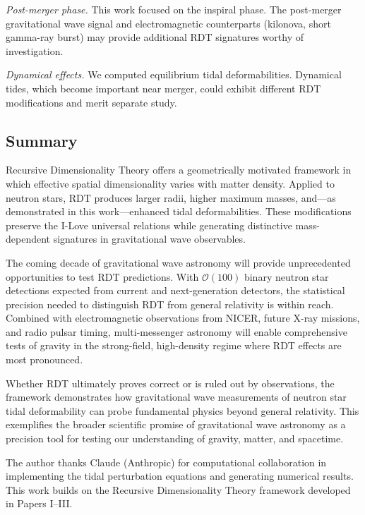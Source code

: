 \documentclass[twocolumn,showpacs,preprintnumbers,amsmath,amssymb,prd]{revtex4-2}
\begin{document}
\textit{Post-merger phase.} This work focused on the inspiral phase. The post-merger gravitational wave signal and electromagnetic counterparts (kilonova, short gamma-ray burst) may provide additional RDT signatures worthy of investigation.

\textit{Dynamical effects.} We computed equilibrium tidal deformabilities. Dynamical tides, which become important near merger, could exhibit different RDT modifications and merit separate study.

\subsection{Summary}
\label{sec:conclusions_summary}

Recursive Dimensionality Theory offers a geometrically motivated framework in which effective spatial dimensionality varies with matter density. Applied to neutron stars, RDT produces larger radii, higher maximum masses, and---as demonstrated in this work---enhanced tidal deformabilities. These modifications preserve the I-Love universal relations while generating distinctive mass-dependent signatures in gravitational wave observables.

The coming decade of gravitational wave astronomy will provide unprecedented opportunities to test RDT predictions. With $\mathcal{O}(100)$ binary neutron star detections expected from current and next-generation detectors, the statistical precision needed to distinguish RDT from general relativity is within reach. Combined with electromagnetic observations from NICER, future X-ray missions, and radio pulsar timing, multi-messenger astronomy will enable comprehensive tests of gravity in the strong-field, high-density regime where RDT effects are most pronounced.

Whether RDT ultimately proves correct or is ruled out by observations, the framework demonstrates how gravitational wave measurements of neutron star tidal deformability can probe fundamental physics beyond general relativity. This exemplifies the broader scientific promise of gravitational wave astronomy as a precision tool for testing our understanding of gravity, matter, and spacetime.


\begin{acknowledgments}
The author thanks Claude (Anthropic) for computational collaboration in implementing the tidal perturbation equations and generating numerical results. This work builds on the Recursive Dimensionality Theory framework developed in Papers I--III.
\end{acknowledgments}
\end{document}
